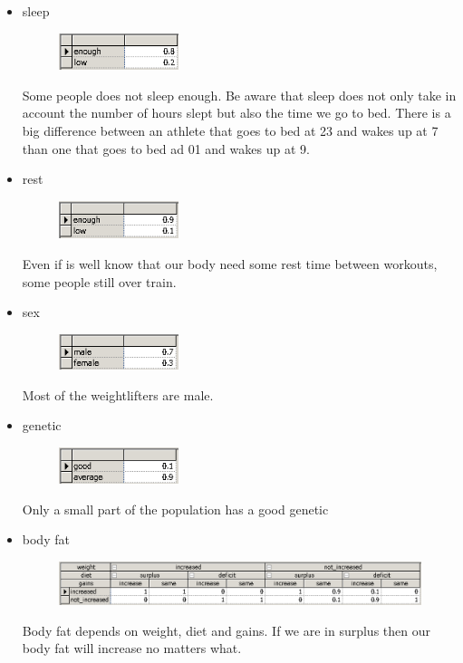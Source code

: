 \documentclass[11pt]{article}
\begin{document}
\begin{itemize}
\item sleep
\begin{figure}[H]
\includegraphics[width=0.33\textwidth]{./images/nodes/definitions/4.png}
\end{figure}

Some people does not sleep enough. Be aware that sleep does not only take in account the number of hours slept but also the time we go to bed. There is a big difference between an athlete that goes to bed at 23 and wakes up at 7 than one that goes to bed ad 01 and wakes up at 9.

\item rest
\begin{figure}[H]
\includegraphics[width=0.33\textwidth]{./images/nodes/definitions/5.png}
\end{figure}

Even if is well know that our body need some rest time between workouts, some people still over train.

\item sex
\begin{figure}[H]
\includegraphics[width=0.33\textwidth]{./images/nodes/definitions/6.png}
\end{figure}
Most of the weightlifters are male.

\item genetic
\begin{figure}[H]
\includegraphics[width=0.33\textwidth]{./images/nodes/definitions/7.png}
\end{figure}
Only a small part of the population has a good genetic

\item body fat
\begin{figure}[H]
\includegraphics[width=\textwidth]{./images/nodes/definitions/8.png}
\end{figure}
Body fat depends on weight, diet and gains. If we are in surplus then our body fat will increase no matters what.


\end{itemize}
\end{document}
